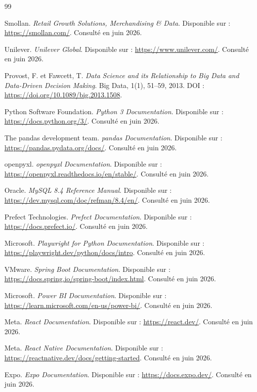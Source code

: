\documentclass[12pt,a4paper,openany]{report}
\begin{document}
\begin{thebibliography}{99}
\sloppy

Smollan.
\textit{Retail Growth Solutions, Merchandising \& Data}.
Disponible sur : \url{https://smollan.com/}.
Consulté en juin 2026.

Unilever.
\textit{Unilever Global}.
Disponible sur : \url{https://www.unilever.com/}.
Consulté en juin 2026.

Provost, F. et Fawcett, T.
\textit{Data Science and its Relationship to Big Data and Data-Driven Decision Making}.
Big Data, 1(1), 51--59, 2013.
DOI : \url{https://doi.org/10.1089/big.2013.1508}.

Python Software Foundation.
\textit{Python 3 Documentation}.
Disponible sur : \url{https://docs.python.org/3/}.
Consulté en juin 2026.

The pandas development team.
\textit{pandas Documentation}.
Disponible sur : \url{https://pandas.pydata.org/docs/}.
Consulté en juin 2026.

openpyxl.
\textit{openpyxl Documentation}.
Disponible sur : \url{https://openpyxl.readthedocs.io/en/stable/}.
Consulté en juin 2026.

Oracle.
\textit{MySQL 8.4 Reference Manual}.
Disponible sur : \url{https://dev.mysql.com/doc/refman/8.4/en/}.
Consulté en juin 2026.

Prefect Technologies.
\textit{Prefect Documentation}.
Disponible sur : \url{https://docs.prefect.io/}.
Consulté en juin 2026.

Microsoft.
\textit{Playwright for Python Documentation}.
Disponible sur : \url{https://playwright.dev/python/docs/intro}.
Consulté en juin 2026.

VMware.
\textit{Spring Boot Documentation}.
Disponible sur : \url{https://docs.spring.io/spring-boot/index.html}.
Consulté en juin 2026.

Microsoft.
\textit{Power BI Documentation}.
Disponible sur : \url{https://learn.microsoft.com/en-us/power-bi/}.
Consulté en juin 2026.

Meta.
\textit{React Documentation}.
Disponible sur : \url{https://react.dev/}.
Consulté en juin 2026.

Meta.
\textit{React Native Documentation}.
Disponible sur : \url{https://reactnative.dev/docs/getting-started}.
Consulté en juin 2026.

Expo.
\textit{Expo Documentation}.
Disponible sur : \url{https://docs.expo.dev/}.
Consulté en juin 2026.

\end{thebibliography}


\appendix
% 
\end{document}
